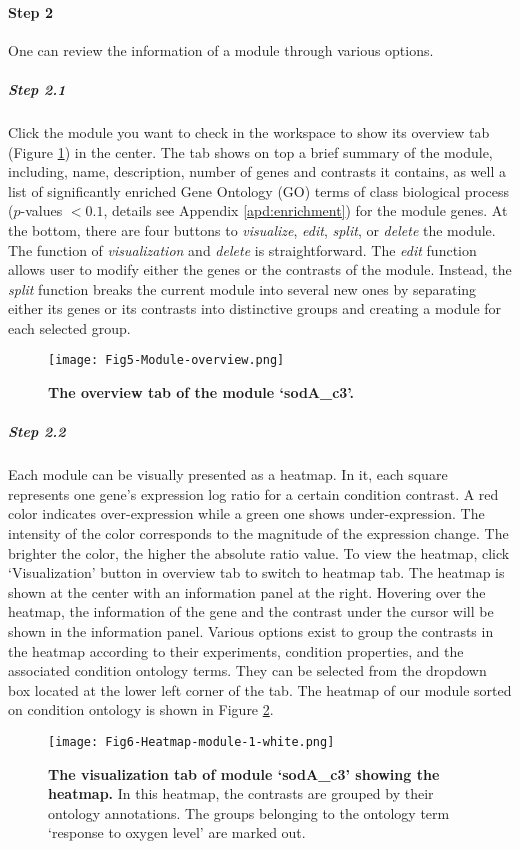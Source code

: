 \begin{small} %
\paragraph{Step 2} One can review the information of a module through various options.

\subparagraph{Step 2.1}	Click the module you want to check in the workspace to show its overview tab (Figure  \ref{fig:colombos-init-module}) in the center. The tab shows on top a brief summary of the module, including, name, description, number of genes and contrasts it contains, as well a list of significantly enriched Gene Ontology (GO) terms of class biological process ($p$-values $< 0.1$, details see Appendix \ref{apd:enrichment}) for the module genes. At the bottom, there are four buttons to \textit{visualize}, \textit{edit}, \textit{split}, or \textit{delete} the module. The function of \textit{visualization} and \textit{delete} is straightforward. The \textit{edit} function allows user to modify either the genes or the contrasts of the module. Instead, the \textit{split} function breaks the current module into several new ones by separating either its genes or its contrasts into distinctive groups and creating a module for each selected group. 

\begin{figure}[tb]
	\centering
  	\texttt{[image: Fig5-Module-overview.png]}
	\caption[`sodA\_c3' module overview]{\textbf{The overview tab of 
	the module `sodA\_c3'.}}
	\label{fig:colombos-init-module}
\end{figure}


\subparagraph{Step 2.2}	Each module can be visually presented as a heatmap. In it, each square represents one gene's expression log ratio for a certain condition contrast. A red color indicates over-expression while a green one shows under-expression. The intensity of the color corresponds to the magnitude of the expression change. The brighter the color, the higher the absolute ratio value. To view the heatmap, click `Visualization' button in overview tab to switch to heatmap tab.  The heatmap is shown at the center with an information panel at the right. Hovering over the heatmap, the information of the gene and the contrast under the cursor will be shown in the information panel. Various options exist to group the contrasts in the heatmap according to their experiments, condition properties, and the associated condition ontology terms. They can be selected from the dropdown box located at the lower left corner of the tab. The heatmap of our module sorted on condition ontology is shown in Figure \ref{fig:colombos-heatmap-m1}.
%
\begin{figure}[tb]
	\centering
  	\texttt{[image: Fig6-Heatmap-module-1-white.png]}
	\caption[Heatmap of module `sodA\_c3']{\textbf{The visualization tab of 
	module `sodA\_c3' showing the heatmap.}
	In this heatmap, the contrasts are grouped by their ontology annotations. 
	The groups belonging to the ontology term `response to oxygen 
	level' are marked out.}
	\label{fig:colombos-heatmap-m1}
\end{figure}


\end{small}
